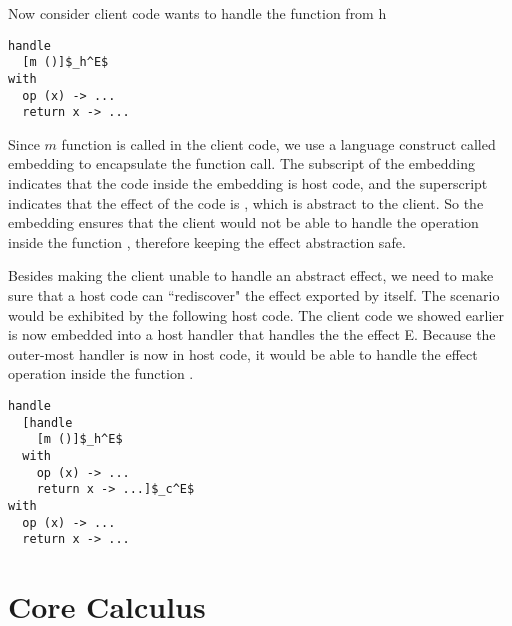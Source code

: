 Now consider client code wants to handle the  function from h\\
\begin{minipage}{\linewidth}
\begin{lstlisting}[mathescape=true]
handle 
  [m ()]$_h^E$
with
  op (x) -> ...
  return x -> ...
\end{lstlisting}
\end{minipage}

Since $m$ function is called in the client code, we use a language construct called embedding to encapsulate the function call. The subscript  of the embedding indicates that the code inside the embedding is host code, and the superscript  indicates that the effect of the code is , which is abstract to the client. So the embedding ensures that the client would not be able to handle the operation inside the function , therefore keeping the effect abstraction safe. 

Besides making the client unable to handle an abstract effect, we need to make sure that a host code can ``rediscover" the effect exported by itself. The scenario would be exhibited by the following host code. The client code we showed earlier is now embedded into a host handler that handles the the effect E. Because the outer-most handler is now in host code, it would be able to handle the effect operation inside the function .

\begin{minipage}{\linewidth}
\begin{lstlisting}[mathescape=true]
handle 
  [handle 
    [m ()]$_h^E$
  with
    op (x) -> ...
    return x -> ...]$_c^E$
with
  op (x) -> ...
  return x -> ...
\end{lstlisting}
\end{minipage}




\section{Core Calculus}
\label{sec-core}
